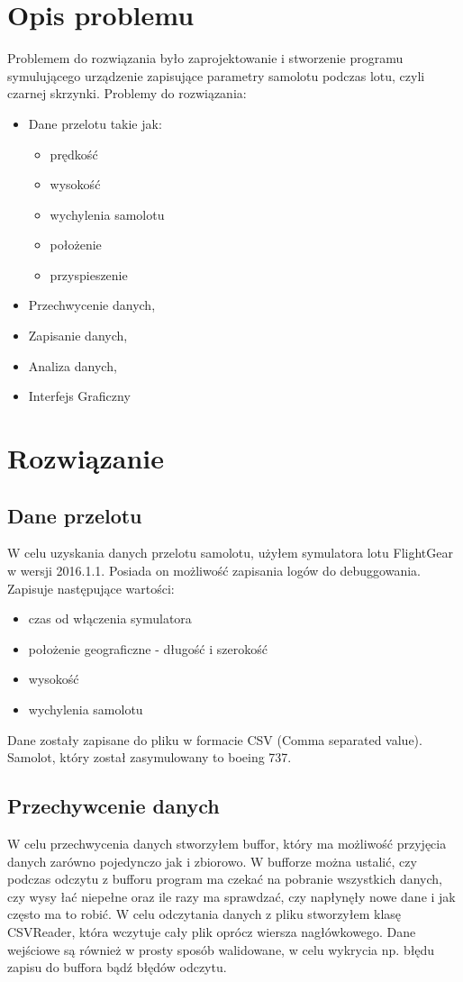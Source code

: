 \documentclass[12pt,a4paper]{article}
\begin{document}
\section{Opis problemu}
Problemem do rozwiązania było zaprojektowanie i stworzenie programu symulującego urządzenie zapisujące parametry samolotu podczas lotu, czyli czarnej skrzynki. 
Problemy do rozwiązania:
\begin{itemize}
\item Dane przelotu takie jak:
	\begin{itemize}
	\item prędkość
	\item wysokość
	\item wychylenia samolotu
	\item położenie
	\item przyspieszenie
	\end{itemize}
\item Przechwycenie danych,
\item Zapisanie danych,
\item Analiza danych,
\item Interfejs Graficzny
\end{itemize}
\section{Rozwiązanie}
\subsection{Dane przelotu}
W celu uzyskania danych przelotu samolotu, użyłem symulatora lotu FlightGear w wersji 2016.1.1. Posiada on możliwość zapisania logów do debuggowania. Zapisuje następujące wartości:
\begin{itemize}
\item czas od włączenia symulatora
\item położenie geograficzne - długość i szerokość
\item wysokość
\item wychylenia samolotu
\end{itemize}
Dane zostały zapisane do pliku w formacie CSV (Comma separated value). Samolot, który został zasymulowany to boeing 737.
\subsection{Przechywcenie danych}
W celu przechwycenia danych stworzyłem buffor, który ma możliwość przyjęcia danych zarówno pojedynczo jak i zbiorowo. W bufforze można ustalić, czy podczas odczytu z bufforu program ma czekać na pobranie wszystkich danych, czy wysy łać niepełne oraz ile razy ma sprawdzać, czy napłynęły nowe dane i jak często ma to robić. W celu odczytania danych z pliku stworzyłem klasę CSVReader, która wczytuje cały plik oprócz wiersza nagłówkowego. Dane wejściowe są również w prosty sposób walidowane, w celu wykrycia np. błędu zapisu do buffora bądź błędów odczytu.
\end{document}
